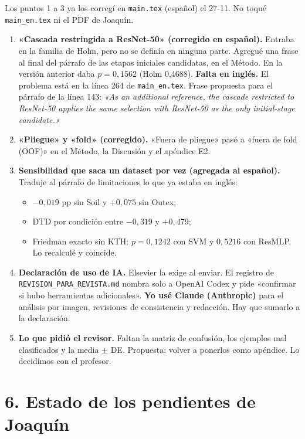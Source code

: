 \documentclass[11pt,a4paper]{article}
\begin{document}
Los puntos 1 a 3 ya los corregí en \texttt{main.tex} (español) el 27-11. No toqué \texttt{main\_en.tex} ni el PDF de Joaquín.

\begin{enumerate}
\item \textbf{«Cascada restringida a ResNet-50» (corregido en español).} Entraba en la familia de Holm, pero no se definía en ninguna parte. Agregué una frase al final del párrafo de las etapas iniciales candidatas, en el Método. En la versión anterior daba $p=0{,}1562$ (Holm 0,4688).
\textbf{Falta en inglés.} El problema está en la línea 264 de \texttt{main\_en.tex}. Frase propuesta para el párrafo de la línea 143: \emph{«As an additional reference, the cascade restricted to ResNet-50 applies the same selection with ResNet-50 as the only initial-stage candidate.»}
\item \textbf{«Pliegue» y «fold» (corregido).} «Fuera de pliegue» pasó a «fuera de fold (OOF)» en el Método, la Discusión y el apéndice E2.
\item \textbf{Sensibilidad que saca un dataset por vez (agregada al español).} Traduje al párrafo de limitaciones lo que ya estaba en inglés:
  \begin{itemize}
  \item $-0{,}019$ pp sin Soil y $+0{,}075$ sin Outex;
  \item DTD por condición entre $-0{,}319$ y $+0{,}479$;
  \item Friedman exacto sin KTH: $p=0{,}1242$ con SVM y $0{,}5216$ con ResMLP. Lo recalculé y coincide.
  \end{itemize}
\item \textbf{Declaración de uso de IA.} Elsevier la exige al enviar. El registro de \texttt{REVISION\_PARA\_REVISTA.md} nombra solo a OpenAI Codex y pide «confirmar si hubo herramientas adicionales». \textbf{Yo usé Claude (Anthropic)} para el análisis por imagen, revisiones de consistencia y redacción. Hay que sumarlo a la declaración.
\item \textbf{Lo que pidió el revisor.} Faltan la matriz de confusión, los ejemplos mal clasificados y la media $\pm$ DE. Propuesta: volver a ponerlos como apéndice. Lo decidimos con el profesor.
\end{enumerate}

\section{6. Estado de los pendientes de Joaquín}
\end{document}
